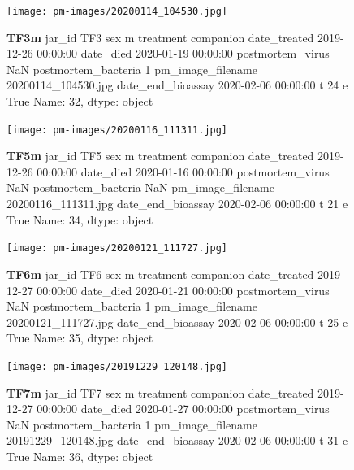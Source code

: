 \begin{figure}[h!]
\centering
\texttt{[image: pm-images/20200114\_104530.jpg]}
\caption{\textbf{TF3m} jar\_id                                 TF3
sex                                      m
treatment                        companion
date\_treated           2019-12-26 00:00:00
date\_died              2020-01-19 00:00:00
postmortem\_virus                       NaN
postmortem\_bacteria                      1
pm\_image\_filename      20200114\_104530.jpg
date\_end\_bioassay      2020-02-06 00:00:00
t                                       24
e                                     True
Name: 32, dtype: object}
\end{figure}
\clearpage

\begin{figure}[h!]
\centering
\texttt{[image: pm-images/20200116\_111311.jpg]}
\caption{\textbf{TF5m} jar\_id                                 TF5
sex                                      m
treatment                        companion
date\_treated           2019-12-26 00:00:00
date\_died              2020-01-16 00:00:00
postmortem\_virus                       NaN
postmortem\_bacteria                    NaN
pm\_image\_filename      20200116\_111311.jpg
date\_end\_bioassay      2020-02-06 00:00:00
t                                       21
e                                     True
Name: 34, dtype: object}
\end{figure}
\clearpage

\begin{figure}[h!]
\centering
\texttt{[image: pm-images/20200121\_111727.jpg]}
\caption{\textbf{TF6m} jar\_id                                 TF6
sex                                      m
treatment                        companion
date\_treated           2019-12-27 00:00:00
date\_died              2020-01-21 00:00:00
postmortem\_virus                       NaN
postmortem\_bacteria                      1
pm\_image\_filename      20200121\_111727.jpg
date\_end\_bioassay      2020-02-06 00:00:00
t                                       25
e                                     True
Name: 35, dtype: object}
\end{figure}
\clearpage

\begin{figure}[h!]
\centering
\texttt{[image: pm-images/20191229\_120148.jpg]}
\caption{\textbf{TF7m} jar\_id                                 TF7
sex                                      m
treatment                        companion
date\_treated           2019-12-27 00:00:00
date\_died              2020-01-27 00:00:00
postmortem\_virus                       NaN
postmortem\_bacteria                      1
pm\_image\_filename      20191229\_120148.jpg
date\_end\_bioassay      2020-02-06 00:00:00
t                                       31
e                                     True
Name: 36, dtype: object}
\end{figure}
\clearpage

